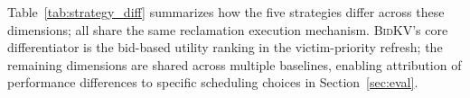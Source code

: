 \documentclass[conference]{IEEEtran}
\newcommand{\bidkv}{\textsc{BidKV}\xspace}
\newcommand{\utilfn}{\ensuremath{U}}
\newcommand{\tokfree}{\ensuremath{r}}
\newcommand{\qualdelta}{\ensuremath{\delta}}
\newcommand{\stabeps}{\ensuremath{\varepsilon}}
\begin{document}
Table~\ref{tab:strategy_diff} summarizes how the five strategies differ
across these dimensions; all share the same reclamation execution mechanism.
\bidkv's core differentiator is the bid-based utility ranking in the
victim-priority refresh; the remaining dimensions are shared across multiple
baselines, enabling attribution of performance differences to specific
scheduling choices in Section~\ref{sec:eval}.



\end{document}

